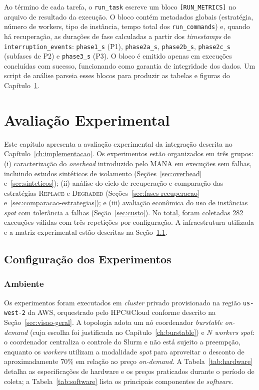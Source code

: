 Ao término de cada tarefa, o \texttt{run\_task} escreve um bloco
\texttt{[RUN\_METRICS]} no arquivo de resultado da execução. O bloco contém metadados
globais (estratégia, número de workers, tipo de instância, tempo total dos
\texttt{run\_commands}) e, quando há recuperação, as durações de fase calculadas a
partir dos \textit{timestamps} de \texttt{interruption\_events}: \texttt{phase1\_s}
(P1), \texttt{phase2a\_s}, \texttt{phase2b\_s}, \texttt{phase2c\_s} (subfases de P2) e
\texttt{phase3\_s} (P3). O bloco é emitido apenas em execuções concluídas com sucesso,
funcionando como garantia de integridade dos dados. Um script de análise parseia esses
blocos para produzir as tabelas e figuras do Capítulo~\ref{ch:avaliacao}.


\chapter{Avaliação Experimental}
\label{ch:avaliacao}

Este capítulo apresenta a avaliação experimental da integração descrita no
Capítulo~\ref{ch:implementacao}. Os experimentos estão organizados em três grupos:
(i) caracterização do \textit{overhead} introduzido pelo MANA em execuções sem falhas,
incluindo estudos sintéticos de isolamento
(Seções~\ref{sec:overhead} e~\ref{sec:sinteticos}); (ii) análise do ciclo de recuperação
e comparação das estratégias \textsc{Replace} e \textsc{Degraded}
(Seções~\ref{sec:fases-recuperacao} e~\ref{sec:comparacao-estrategias}); e
(iii) avaliação econômica do uso de instâncias \textit{spot} com tolerância a falhas
(Seção~\ref{sec:custo}). No total, foram coletadas 282 execuções válidas com três
repetições por configuração. A infraestrutura utilizada e a matriz experimental estão
descritas na Seção~\ref{sec:config-exp}.

\section{Configuração dos Experimentos}
\label{sec:config-exp}

\subsection{Ambiente}
\label{sec:ambiente}

Os experimentos foram executados em \textit{cluster} privado provisionado na região
\texttt{us-west-2} da AWS, orquestrado pelo HPC@Cloud conforme descrito na
Seção~\ref{sec:visao-geral}. A topologia adota um nó coordenador \textit{burstable on-demand}
(cuja escolha foi justificada no Capítulo~\ref{ch:burstable}) e $N$ \textit{workers}
\textit{spot}: o coordenador centraliza o controle do Slurm e não está sujeito a
preempção, enquanto os \textit{workers} utilizam a modalidade \textit{spot} para
aproveitar o desconto de aproximadamente 70\% em relação ao preço \textit{on-demand}. A Tabela~\ref{tab:hardware} detalha as especificações de hardware
e os preços praticados durante o período de coleta; a Tabela~\ref{tab:software} lista
os principais componentes de \textit{software}.

